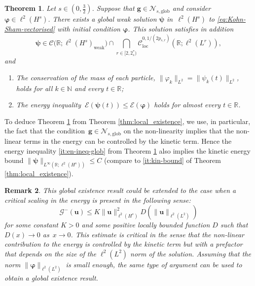 \documentclass[12pt,a4paper]{amsart}
\newtheorem{theorem}{Theorem}[section]
\newtheorem{remark}[theorem]{Remark}
\numberwithin{equation}{section}
\newcommand{\ulu}{\boldsymbol{u}}
\newcommand{\ulg}{\boldsymbol{g}}
\newcommand{\ulpsi}{\boldsymbol{\psi}}
\newcommand{\ulphi}{\boldsymbol{\varphi}}
\newcommand{\twoasts}{{2^*_s}}
\newcommand{\Nglob}{\mathscr{N}_{s,\mathrm{glob}}}
\begin{document}
	\begin{theorem}\label{thm:global_existence}
		Let $s\in(0,\frac32)$. Suppose that $\ulg\in\Nglob$ and consider $ \ulphi  \in \ell^2(H^{s}) $. There exists a global weak solution $ \ulpsi$ in~$\ell^2(H^s)$ to \eqref{eq:Kohn-Sham-vectorised}  with initial condition $ \ulphi $. This solution satisfies in addition
		\begin{equation}
			\ulpsi \in \mathscr{C}\big(\mathbb{R};\ell^2(H^{s})_{\mathrm{weak}}\big) \cap \bigcap_{r \in [2,\twoasts ) } \mathscr{C}_{\mathrm{loc}}^{0,1/(2p_{s,r})}(\mathbb{R};\ell^2(L^r)) ,
		\end{equation}
		and
		\begin{enumerate}[label=\roman*)]
			\item The conservation of the mass of each particle, $\| \varphi_k \|_{L^2} = \| \psi_k(t) \|_{L^2} $, holds for all $k \in \mathbb{N}$ and every $ t \in \mathbb{R}$;
			\item \label{it:en-ineq-glob} The energy inequality  $ \ \mathcal{E}(\ulpsi(t)) \leq \mathcal{E}(\ulphi ) $ holds for almost every  $t \in \mathbb{R}$.
		\end{enumerate}
	\end{theorem}
	
	To deduce Theorem \ref{thm:global_existence} from Theorem \ref{thm:local_existence}, we use, in particular, the fact that the condition~$\ulg\in\Nglob$ on the non-linearity implies that the non-linear terms in the energy can be controlled by the kinetic term. Hence the energy inequality \ref{it:en-ineq-glob} from Theorem \ref{thm:global_existence} also implies the kinetic energy bound $ \| \ulpsi \|_{L^{\infty}(\mathbb{R} ; \ell^2(H^{s}))}  \leq C $ (compare to \ref{it:kin-bound} of Theorem \ref{thm:local_existence}).
	
	\begin{remark}
		This global existence result could be extended to the case when a critical scaling in the energy is present in the following sense:
		\begin{equation*}
			\mathscr{G}^-(\ulu)  \leq K \| \ulu \|_{\ell^2(H^s)}^{2} D(\| \ulu \|_{\ell^2(L^2)})
		\end{equation*}
		for some constant $K>0$ and some positive locally bounded function $D$ such that $D(x) \rightarrow 0$ as~$x \rightarrow 0$. This estimate is critical in the sense that the non-linear contribution to the energy is controlled by the kinetic term but with a prefactor that depends on the size of the $\ell^2(L^2)$ norm of the solution. Assuming that the norm $ \| \ulphi \|_{\ell^2(L^2)}$ is small enough, the same type of argument can be used to obtain a global existence result.
	\end{remark}
	
\end{document}
